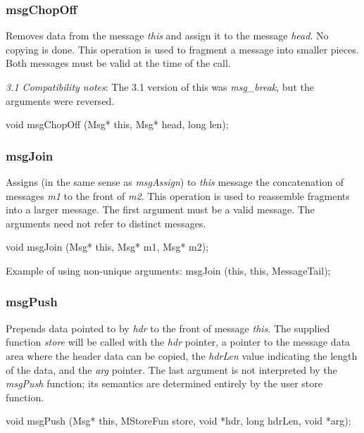 \subsubsection{msgChopOff}

Removes data from the message {\em this} and assign it to the message
{\em head}.  No copying is done. This operation is used to fragment
a message into smaller pieces.  Both messages must be valid at the
time of the call.
\medskip

{\em 3.1 Compatibility notes}:
The 3.1 version of this was {\em msg\_break}, but the arguments were reversed.
\medskip

{\sem void} {\bold msgChopOff} ({\sem Msg*} {\caps this}, {\sem Msg*} {\caps head}, {\sem long} {\caps len});
\medskip

\subsubsection{msgJoin}

Assigns (in the same sense as {\em msgAssign}) 
to {\em this} message the concatenation of messages {\em m1}
to the front of {\em m2}. This operation is used to reassemble fragments
into a larger message.  The first argument must be a valid message.  The
arguments need not refer to distinct messages.
\medskip

{\sem void} {\bold msgJoin} ({\sem Msg*} {\caps this}, {\sem Msg*} {\caps m1}, {\sem Msg*} {\caps m2});
\medskip

Example of using non-unique arguments:
\medskip
{\bold msgJoin} ({\caps this},  {\caps this}, {\caps MessageTail});
\medskip

\subsubsection{msgPush}

Prepends data pointed to by {\em hdr} to the front of message {\em
this}.  The supplied function {\em store} will be called with the {\em
hdr} pointer, a pointer to the message data area where the header data
can be copied, the {\em hdrLen} value indicating the length of the
data, and the {\em arg} pointer.  The last argument is not interpreted
by the {\em msgPush} function; its semantics are determined entirely
by the user store function.
\medskip

{\sem void} {\bold msgPush} ({\sem Msg*} {\caps this}, {\sem MStoreFun} {\caps  store}, {\sem void} *{\caps hdr}, {\sem long} {\caps hdrLen}, {\sem void} *{\caps arg});
\medskip

